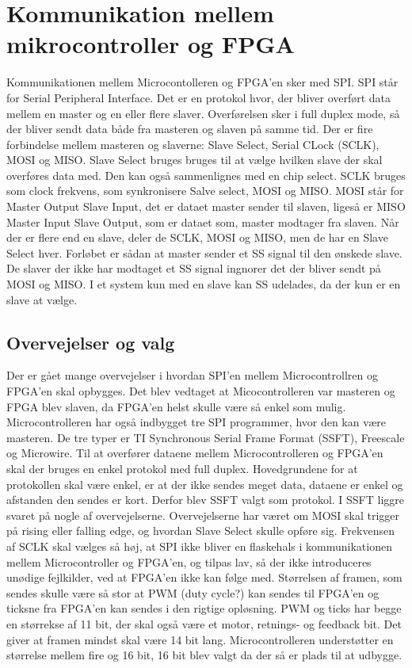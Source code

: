 \section{Kommunikation mellem mikrocontroller og FPGA}

Kommunikationen mellem Microcontolleren og FPGA’en sker med SPI. SPI står for Serial Peripheral Interface. Det er en protokol hvor, der bliver overført data mellem en master og en eller flere slaver. Overførelsen sker i full duplex mode, så der bliver sendt data både fra masteren og slaven på samme tid.
Der er fire forbindelse mellem masteren og slaverne: Slave Select, Serial CLock (SCLK), MOSI og MISO. Slave Select bruges bruges til at vælge hvilken slave der skal overføres data med. Den kan også sammenlignes med en chip select. SCLK bruges som clock frekvens, som synkronisere Salve select, MOSI og MISO. MOSI står for Master Output Slave Input, det er dataet master sender til slaven, ligeså er MISO Master Input Slave Output, som er dataet som, master modtager fra slaven.
Når der er flere end en slave, deler de SCLK, MOSI og MISO, men de har en Slave Select hver. Forløbet er sådan at master sender et SS signal til den ønskede slave. De slaver der ikke har modtaget et SS signal ingnorer det der bliver sendt på MOSI og MISO. I et system kun med en slave kan SS udelades, da der kun er en slave at vælge. 

\subsection{Overvejelser og valg}
Der er gået mange overvejelser i hvordan SPI'en mellem Microcontrollren og FPGA'en skal  opbygges.
Det blev vedtaget at Micocontrolleren var masteren og FPGA blev slaven, da FPGA'en helst skulle være så enkel som mulig.
Microcontrolleren har også indbygget tre SPI programmer, hvor den kan være masteren. De tre typer er TI Synchronous Serial Frame Format (SSFT), Freescale og Microwire. Til at overfører dataene mellem Microcontrolleren og FPGA’en skal der bruges en enkel protokol med full duplex. Hovedgrundene for at protokollen skal være enkel, er at der ikke sendes meget data, dataene er enkel og afstanden den sendes er kort. Derfor blev SSFT valgt som protokol. I SSFT liggre svaret på nogle af overvejelserne. Overvejelserne har været om MOSI skal trigger på rising eller falling edge, og hvordan Slave Select skulle opføre sig.   
Frekvensen af SCLK skal vælges så høj, at SPI ikke bliver en flaskehals i kommunikationen mellem Microcontroller og FPGA’en, og tilpas lav, så der ikke introduceres unødige fejlkilder, ved at FPGA’en ikke kan følge med. 
Størrelsen af framen, som sendes skulle være så stor at PWM (duty cycle?) kan sendes til FPGA’en og ticksne fra FPGA’en kan sendes i den rigtige opløsning. PWM og ticks har begge en størrekse af 11 bit, der skal også være et motor, retnings- og feedback bit.  Det giver at framen mindst skal være 14 bit lang. Microcontrolleren understøtter en størrelse mellem fire og 16 bit, 16 bit blev valgt da der så er plads til at udbygge.



